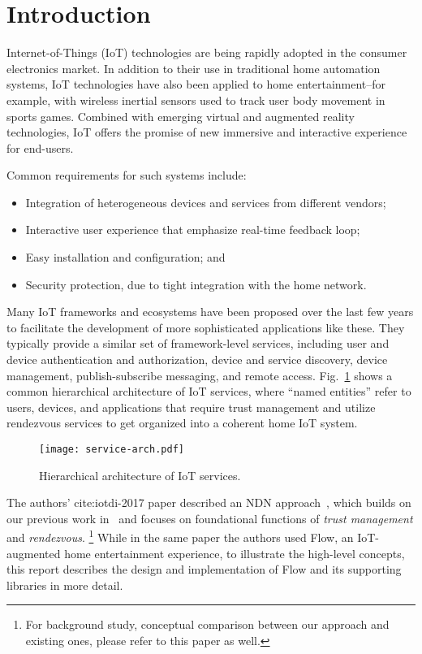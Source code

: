 \section{Introduction}
\label{sec:introduction}

Internet-of-Things (IoT) technologies are being rapidly adopted in the consumer electronics market.
In addition to their use in traditional home automation systems, IoT technologies have also been applied to home entertainment--for example, with wireless inertial sensors used to track user body movement in sports games. 
Combined with emerging virtual and augmented reality technologies, IoT offers the promise of new immersive and interactive experience for end-users.

Common requirements for such systems include:
\begin{itemize}
\item Integration of heterogeneous devices and services from different vendors;
\item Interactive user experience that emphasize real-time feedback loop;
\item Easy installation and configuration; and
\item Security protection, due to tight integration with the home network.
\end{itemize}

Many IoT frameworks and ecosystems have been proposed over the last few years to facilitate the development of more sophisticated applications like these.
They typically provide a similar set of framework-level services, including user and device authentication and authorization, device and service discovery, device management, publish-subscribe messaging, and remote access.
Fig.~\ref{fig:service-arch} shows a common hierarchical architecture of IoT services, where ``named entities'' refer to users, devices, and applications that require trust management and utilize rendezvous services to get organized into a coherent home IoT system.

\begin{figure}[!t]
\centering
\texttt{[image: service-arch.pdf]}
\caption{Hierarchical architecture of IoT services.}
\label{fig:service-arch}
\end{figure}

The authors' cite:iotdi-2017 paper described an NDN approach~\cite{ccn-van,ndn}, which builds on our previous work in~\cite{ndn-iot} and focuses on foundational functions of \emph{trust management} and \emph{rendezvous}.
\footnote{For background study, conceptual comparison between our approach and existing ones, please refer to this paper as well.}
While in the same paper the authors used Flow, an IoT-augmented home entertainment experience, to illustrate the high-level concepts, this report describes the design and implementation of Flow and its supporting libraries in more detail.

